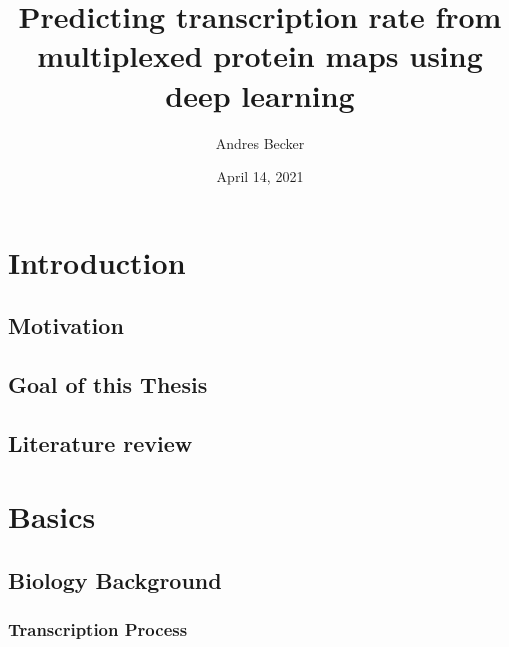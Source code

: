 \documentclass[biblatexBackend=bibtex]{tumthesis}
\author{Andres Becker}
\title{Predicting transcription rate from multiplexed protein maps using deep learning}
\institute{Chair of Mathematical Modeling of Biological Systems}
\date{April 14, 2021} %
\begin{document}
\pagestyle{empty}
\frontmatter%
\maketitlepage%





\tableofcontents%

\mainmatter%
\pagestyle{headings}

\chapter{Introduction}
\label{ch:introduction}


\section{Motivation}
\label{sec:intro:motivation}


\section{Goal of this Thesis}
\label{sec:intro:goals}


\section{Literature review}
\label{sec:intro:literature_review}


\chapter{Basics}
\label{ch:basics}


\section{Biology Background}
\label{sec:basics:bio_back}

\subsection{Transcription Process}
\label{sec:basics:transcription_process}

\end{document}
